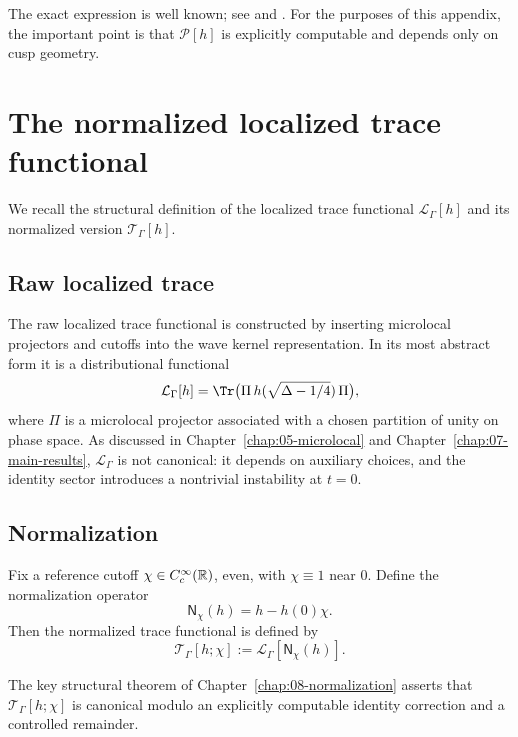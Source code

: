 The exact expression is well known; see \cite[\S~2--3]{Hejhal1983} and \cite[Ch.~6]{Iwaniec2002}.
For the purposes of this appendix, the important point is that $\mathcal{P}[h]$ is explicitly computable and depends
only on cusp geometry.

\section{The normalized localized trace functional}
\label{sec:H.localized}

We recall the structural definition of the localized trace functional $\mathcal{L}_\Gamma[h]$ and its normalized
version $\mathcal{T}_\Gamma[h]$.

\subsection{Raw localized trace}
\label{subsec:H.raw}

The raw localized trace functional is constructed by inserting microlocal projectors and cutoffs into the wave kernel
representation.  In its most abstract form it is a distributional functional
\[
\mathcal{L}_\Gamma[h]
=
\Tr\big(\Pi\,h(\sqrt{\Delta-1/4})\,\Pi\big),
\]
where $\Pi$ is a microlocal projector associated with a chosen partition of unity on phase space.
As discussed in Chapter~\ref{chap:05-microlocal} and Chapter~\ref{chap:07-main-results}, $\mathcal{L}_\Gamma$ is not
canonical: it depends on auxiliary choices, and the identity sector introduces a nontrivial instability at $t=0$.

\subsection{Normalization}
\label{subsec:H.norm}

Fix a reference cutoff $\chi\in C_c^\infty(\mathbb{R})$, even, with $\chi\equiv 1$ near $0$.
Define the normalization operator
\begin{equation}\label{eq:H.norm.op}
\mathsf{N}_\chi(h)
=
h-h(0)\chi.
\end{equation}
Then the normalized trace functional is defined by
\begin{equation}\label{eq:H.norm.trace}
\mathcal{T}_\Gamma[h;\chi]
:=
\mathcal{L}_\Gamma[\mathsf{N}_\chi(h)].
\end{equation}

The key structural theorem of Chapter~\ref{chap:08-normalization} asserts that $\mathcal{T}_\Gamma[h;\chi]$ is
canonical modulo an explicitly computable identity correction and a controlled remainder.

